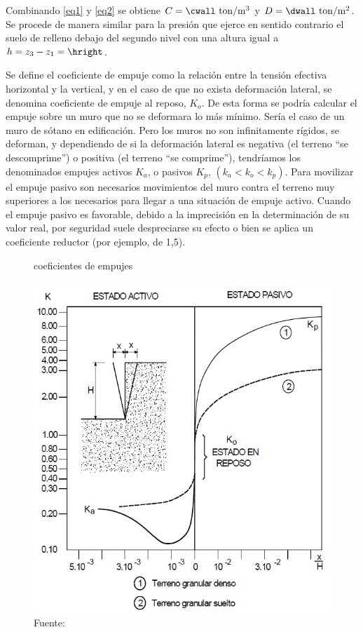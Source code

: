 \noindent Combinando \ref{eq1} y \ref{eq2} se obtiene $C=\cwall\mathrm{~ton/m^3}$ y $D=\dwall\mathrm{~ton/m^2}$.\\
Se procede de manera similar para la presión que ejerce en sentido contrario el suelo de relleno debajo del segundo nivel con una altura igual a $h=z_{3}-z_{1}=\hright$.
  \begin{spacing}{2}
  \leftskip 1.27cm
  \rightskip 1.27cm
\noindent Se define el coeficiente de empuje como la relación entre la tensión efectiva horizontal y la vertical, y en el caso de que no exista deformación lateral, se denomina coeficiente de empuje al reposo, $K_{o}$. De esta forma se podría calcular el empuje sobre un muro que no se deformara lo más mínimo. Sería el caso de un muro de sótano en edificación. Pero los muros no son infinitamente rígidos, se deforman, y dependiendo de si la deformación lateral es negativa (el terreno “se descomprime”) o positiva (el terreno “se comprime”), tendríamos los denominados empujes activos $K_{a}$, o pasivos $K_{p}$, $\left ( k_{a}< k_{o} < k_{p}\right )$. Para movilizar el empuje pasivo son necesarios movimientos del muro contra el terreno muy superiores a los necesarios para llegar a una situación de empuje activo. Cuando el empuje pasivo es favorable, debido a la imprecisión en la determinación de su valor real, por seguridad suele despreciarse su efecto o bien se aplica un coeficiente reductor (por ejemplo, de 1,5). \cite{empuje}
  \end{spacing}

\begin{figure}[h!]
    \centering
    \caption{coeficientes de empujes}
    \includegraphics[scale=0.55]{IMAGENES/empuje.jpg}
    \caption*{\small Fuente: \it \cite{empuje}}
    \label{atrans}
\end{figure} 
  
